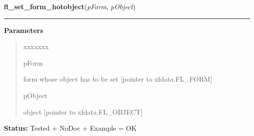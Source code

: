 \hspace{.8\funcindent}\begin{boxedminipage}{\funcwidth}

    \raggedright \textbf{fl\_set\_form\_hotobject}(\textit{pForm}, \textit{pObject})

    \vspace{-1.5ex}

    \rule{\textwidth}{0.5\fboxrule}
\setlength{\parskip}{2ex}
\setlength{\parskip}{1ex}
      \textbf{Parameters}
      \vspace{-1ex}

      \begin{quote}
        \begin{Ventry}{xxxxxxx}

          \item[pForm]

          form whose object has to be set [pointer to xfdata.FL\_FORM]

          \item[pObject]

          object [pointer to xfdata.FL\_OBJECT]

        \end{Ventry}

      \end{quote}

\textbf{Status:} Tested + NoDoc + Example = OK



    \end{boxedminipage}

    \label{xformslib:library:fl_set_form_minsize}

    \vspace{0.5ex}

